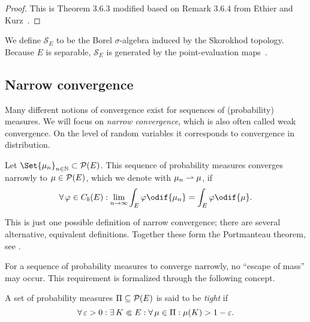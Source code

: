 \begin{proof}
  This is Theorem 3.6.3 modified based on Remark 3.6.4 from Ethier and Kurz~\cite{ethierMarkovProcessesCharacterization1985}.
\end{proof}

We define \(\mathscr{S}_{E}\) to be the Borel \(\sigma\)-algebra induced by the Skorokhod topology.
Because \(E\) is separable, \(\mathscr{S}_{E}\) is generated by the point-evaluation maps~\cite[Proposition 3.7.1]{ethierMarkovProcessesCharacterization1985}.

\subsection{Narrow convergence}

Many different notions of convergence exist for sequences of (probability) measures.
We will focus on \textit{narrow convergence}, which is also often called weak convergence.
On the level of random variables it corresponds to convergence in distribution.

\begin{definition}\label{def:narrow-conv}
  Let \(\Set{\mu_n}_{n\in\bN} \subset \cP(E)\).
  This sequence of probability measures converges narrowly to \(\mu \in \mathcal{P}(E)\), which we denote with \( \mu_n \rightharpoonup \mu \), if
  \begin{equation}
    \forall \varphi \in C_b(E) : \lim_{n\to\infty} \int_E \varphi \odif{\mu_n} = \int_E \varphi \odif{\mu}.
  \end{equation}
\end{definition}

\begin{remark}
  This is just one possible definition of narrow convergence; there are several alternative, equivalent definitions.
  Together these form the Portmanteau theorem, see \cite[16]{billingsleyConvergenceProbabilityMeasures1999}.
\end{remark}

For a sequence of probability measures to converge narrowly, no \enquote{escape of mass} may occur.
This requirement is formalized through the following concept.

\begin{definition}
  A set of probability measures \(\Pi \subseteq \mathcal{P}(E)\) is said to be \textit{tight} if
  \begin{equation}
    \forall \eps > 0 : \exists K \Subset E : \forall \mu \in \Pi : \mu(K) > 1 - \eps.
  \end{equation}
\end{definition}

